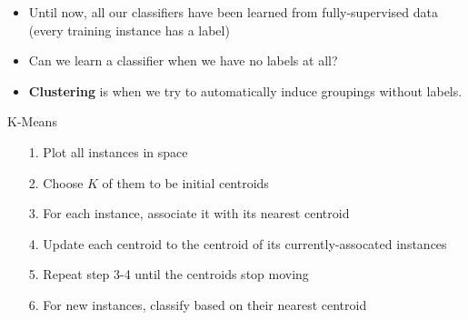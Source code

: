 \documentclass[11pt,letterpaper]{article}
\begin{document}
\begin{itemize}
  \item Until now, all our classifiers have been learned from fully-supervised data (every training instance has a label)
  \item Can we learn a classifier when we have no labels at all?
  \item \textbf{Clustering} is when we try to automatically induce groupings without labels.
\end{itemize}

K-Means

\begin{itemize}
  \item[1.] Plot all instances in space
  \item[2.] Choose $K$ of them to be initial centroids
  \item[3.] For each instance, associate it with its nearest centroid
  \item[4.] Update each centroid to the centroid of its currently-assocated instances
  \item[5.] Repeat step 3-4 until the centroids stop moving
  \item[6.] For new instances, classify based on their nearest centroid
\end{itemize}
\end{document}
